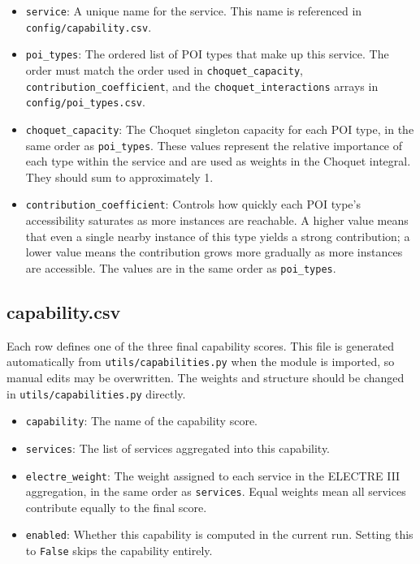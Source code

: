 \documentclass[11pt]{article}
\begin{document}
\begin{itemize}
  \item \texttt{service}: A unique name for the service. This name is referenced in \texttt{config/capability.csv}.
  \item \texttt{poi\_types}: The ordered list of POI types that make up this service. The order must match the order used in \texttt{choquet\_capacity}, \texttt{contribution\_coefficient}, and the \texttt{choquet\_interactions} arrays in \texttt{config/poi\_types.csv}.
  \item \texttt{choquet\_capacity}: The Choquet singleton capacity for each POI type, in the same order as \texttt{poi\_types}. These values represent the relative importance of each type within the service and are used as weights in the Choquet integral. They should sum to approximately 1.
  \item \texttt{contribution\_coefficient}: Controls how quickly each POI type's accessibility saturates as more instances are reachable. A higher value means that even a single nearby instance of this type yields a strong contribution; a lower value means the contribution grows more gradually as more instances are accessible. The values are in the same order as \texttt{poi\_types}.
\end{itemize}

\subsection*{capability.csv}

Each row defines one of the three final capability scores. This file is generated automatically from \texttt{utils/capabilities.py} when the module is imported, so manual edits may be overwritten. The weights and structure should be changed in \texttt{utils/capabilities.py} directly.

\begin{itemize}
  \item \texttt{capability}: The name of the capability score.
  \item \texttt{services}: The list of services aggregated into this capability.
  \item \texttt{electre\_weight}: The weight assigned to each service in the ELECTRE III aggregation, in the same order as \texttt{services}. Equal weights mean all services contribute equally to the final score.
  \item \texttt{enabled}: Whether this capability is computed in the current run. Setting this to \texttt{False} skips the capability entirely.
\end{itemize}
\end{document}
